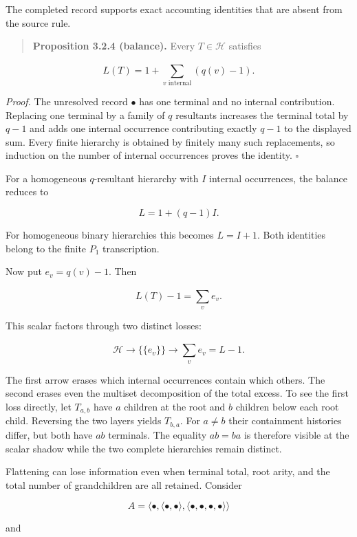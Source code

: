 \documentclass[11pt,a4paper]{article}
\begin{document}
The completed record supports exact accounting identities that are
absent from the source rule.

\begin{quote}
\textbf{Proposition 3.2.4 (balance).} Every \(T \in \mathcal{H}\)
satisfies
\end{quote}

\[\boxed{L(T) = 1 + \sum_{v\text{ internal}}^{}\left( q(v) - 1 \right).}\]

\emph{Proof.} The unresolved record \(\bullet\) has one terminal and no
internal contribution. Replacing one terminal by a family of \(q\)
resultants increases the terminal total by \(q - 1\) and adds one
internal occurrence contributing exactly \(q - 1\) to the displayed sum.
Every finite hierarchy is obtained by finitely many such replacements,
so induction on the number of internal occurrences proves the identity.
\(\ensuremath{\square}\)

For a homogeneous \(q\)-resultant hierarchy with \(I\) internal
occurrences, the balance reduces to

\[L = 1 + (q - 1)I.\]

For homogeneous binary hierarchies this becomes \(L = I + 1\). Both
identities belong to the finite \(P_{1}\) transcription.

Now put \(e_{v} = q(v) - 1\). Then

\[L(T) - 1 = \sum_{v}^{}e_{v}.\]

This scalar factors through two distinct losses:

\[\mathcal{H} \rightarrow \{\{ e_{v}\}\} \rightarrow \sum_{v}^{}e_{v} = L - 1.\]

The first arrow erases which internal occurrences contain which others.
The second erases even the multiset decomposition of the total excess.
To see the first loss directly, let \(T_{a,b}\) have \(a\) children at
the root and \(b\) children below each root child. Reversing the two
layers yields \(T_{b,a}\). For \(a \neq b\) their containment histories
differ, but both have \(ab\) terminals. The equality \(ab = ba\) is
therefore visible at the scalar shadow while the two complete
hierarchies remain distinct.

Flattening can lose information even when terminal total, root arity,
and the total number of grandchildren are all retained. Consider

\[A = \langle \bullet ,\langle \bullet , \bullet \rangle,\langle \bullet , \bullet , \bullet , \bullet \rangle\rangle\]

and
\end{document}
